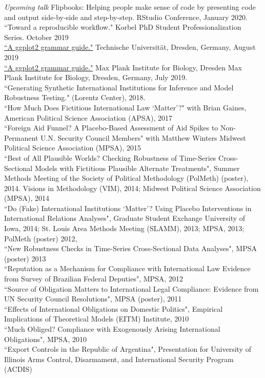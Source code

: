 \documentclass[margin, 10pt]{CVStyleTemplate}\usepackage[]{graphicx}\usepackage[]{color}
\begin{document}
\begin{resume}
\emph{Upcoming talk} Flipbooks: Helping people make sense of code by presenting code and output side-by-side and step-by-step. RStudio Conference, January 2020.  \\[6pt]
%
``Toward a reproducible workflow."  Korbel PhD Student Professionalization Series. October 2019 \\[6pt]
%
\href{https://evamaerey.github.io/ggplot2_grammar_guide/ggplot2_grammar_guide}{``A ggplot2 grammar guide."} Technische Universit\"{a}t, Dresden, Germany, August 2019 \\[6pt]
%
\href{https://evamaerey.github.io/ggplot2_grammar_guide/ggplot2_grammar_guide}{``A ggplot2 grammar guide."} Max Plank Institute for Biology, Dresden
Max Plank Institute for Biology, Dresden, Germany, July 2019. \\[6pt]
%
``Generating Synthetic International Institutions for Inference and Model Robustness Testing." (Lorentz Center), 2018.\\[6pt]%
``How Much Does Fictitious International Law `Matter'?" with Brian Gaines, American Political Science Association (APSA), 2017 \\[6pt]%
``Foreign Aid Funnel? 
A Placebo-Based Assessment of Aid Spikes 
to Non-Permanent U.N. Security Council Members" with Matthew Winters
Midwest Political Science Association (MPSA), 2015\\[6pt]%
``Best of All Plausible Worlds? Checking Robustness of Time-Series Cross-Sectional Models with Fictitious Plausible Alternate Treatments",
Summer Methods Meeting of the Society of Political Methodology (PolMeth) (poster), 2014. %
Visions in Methodology (VIM), 2014;  %
Midwest Political Science Association (MPSA), 2014\\[6pt]%
``Do (Fake) International Institutions `Matter'?  Using Placebo Interventions in International Relations Analyses", 
Graduate Student Exchange University of Iowa,  2014; %
St. Louis Area Methods Meeting (SLAMM), 2013; %
MPSA, 2013;
PolMeth (poster) 2012, \\[6pt]%
``New Robustness Checks in Time-Series Cross-Sectional Data Analyses", MPSA (poster) 2013\\[6pt]%
``Reputation as a Mechanism for Compliance with International Law Evidence from Survey of Brazilian Federal Deputies", MPSA, 2012\\[6pt]%
``Source of Obligation Matters to International Legal Compliance:  Evidence from UN Security Council Resolutions", MPSA (poster), 2011\\[6pt]%
``Effects of International Obligations on Domestic Politics", Empirical Implications of Theoretical Models (EITM) Institute, 2010\\[6pt]%
``Much Obliged? Compliance with Exogenously Arising International Obligations", MPSA, 2010\\[6pt]%
``Export Controls in the Republic of Argentina", Presentation for University of Illinois Arms Control, Disarmament, and International Security Program (ACDIS)\\[6pt]%





\end{resume}
\end{document}
